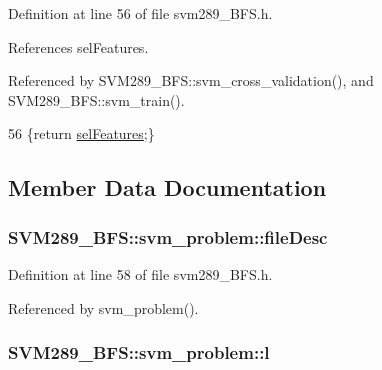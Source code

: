 Definition at line 56 of file svm289\+\_\+\+B\+F\+S.\+h.



References sel\+Features.



Referenced by S\+V\+M289\+\_\+\+B\+F\+S\+::svm\+\_\+cross\+\_\+validation(), and S\+V\+M289\+\_\+\+B\+F\+S\+::svm\+\_\+train().


\begin{DoxyCode}
56 \{\textcolor{keywordflow}{return} \hyperlink{struct_s_v_m289___b_f_s_1_1svm__problem_a3de9b51904777989df0afaed3af9b616}{selFeatures};\}
\end{DoxyCode}


\subsection{Member Data Documentation}
\subsubsection[{\texorpdfstring{file\+Desc}{fileDesc}}]{ S\+V\+M289\+\_\+\+B\+F\+S\+::svm\+\_\+problem\+::file\+Desc}\hypertarget{struct_s_v_m289___b_f_s_1_1svm__problem_a4a6fa480764f4482b0edeeabe7087909}{}\label{struct_s_v_m289___b_f_s_1_1svm__problem_a4a6fa480764f4482b0edeeabe7087909}


Definition at line 58 of file svm289\+\_\+\+B\+F\+S.\+h.



Referenced by svm\+\_\+problem().

\subsubsection[{\texorpdfstring{l}{l}}]{ S\+V\+M289\+\_\+\+B\+F\+S\+::svm\+\_\+problem\+::l}\hypertarget{struct_s_v_m289___b_f_s_1_1svm__problem_afd75fe2ff65aa0c0f27b85b04028b2f3}{}\label{struct_s_v_m289___b_f_s_1_1svm__problem_afd75fe2ff65aa0c0f27b85b04028b2f3}


